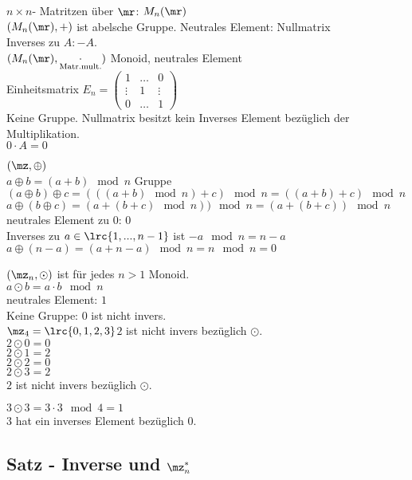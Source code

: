 		\item $n\times n$- Matritzen über $\mr$: $M_n(\mr)$\\
		$(M_n(\mr),+)$ ist abelsche Gruppe. Neutrales Element: Nullmatrix\\
		Inverses zu $A:-A$.\\
		$(M_n(\mr),\underset{\mbox{\scriptsize Matr.mult.}}{\cdot})$ Monoid, neutrales Element\\
		Einheitsmatrix $E_n=\begin{pmatrix}1&\dots&0\\\vdots&1&\vdots\\0&\dots&1
		\end{pmatrix}$\\
		Keine Gruppe. Nullmatrix besitzt kein Inverses Element bezüglich der Multiplikation.\\
		$0\cdot A=0$
		\item $(\mz,\oplus)$\\
		$a\oplus b=(a+b)\mod n$ Gruppe\\
		$(a\oplus b)\oplus c=(((a+b)\mod n)+c)\mod n=((a+b)+c)\mod n$\\
		$a\oplus(b\oplus c)=(a+(b+c)\mod n))\mod n=(a+(b+c))\mod n$\\
		neutrales Element zu $0$: $0$\\
		Inverses zu $a\in\lrc{1,...,n-1}$ ist $-a\mod n=n-a$\\
		$a\oplus(n-a)=(a+n-a)\mod n=n\mod n=0$
		\item $(\mz_n,\odot)$ ist für jedes $n>1$ Monoid.\\
		$a\odot b=a\cdot b\mod n$\\
		neutrales Element: $1$\\
		Keine Gruppe: $0$ ist nicht invers.\\
		$\mz_4=\lrc{0,1,2,3}$\quad $2$ ist nicht invers bezüglich $\odot$.\\
		$2\odot 0=0$\\
		$2\odot 1=2$\\
		$2\odot 2=0$\\
		$2\odot 3=2$\\
		$2$ ist nicht invers bezüglich $\odot$.

		$3\odot 3=3\cdot 3\mod 4=1$\\
		$3$ hat ein inverses Element bezüglich $0$.
	\subExEnd

	\subsection{Satz - Inverse und \texorpdfstring{$\mz^*_n$}{Z*}}

